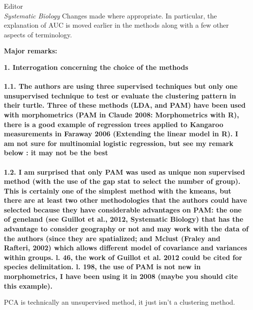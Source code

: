 \documentclass{letter}
\begin{document}
\begin{letter}{Editor \\ \textit{Systematic Biology}}
  Changes made where appropriate. In particular, the explanation of AUC is moved earlier in the methods along with a few other aspects of terminology.


  \textbf{Major remarks: }

  \textbf{1. Interrogation concerning the choice of the methods \\\\
    1.1. The authors are using three supervised techniques but only one unsupervised technique to test or evaluate the clustering pattern in their turtle. Three of these methods (LDA, and PAM) have been used with morphometrics (PAM in Claude 2008: Morphometrics with R), there is a good example of regression trees applied to Kangaroo measurements in Faraway 2006 (Extending the linear model in R). I am not sure for multinomial logistic regression, but see my remark below : it may not be the best\\\\
  1.2. I am surprised that only PAM was used as unique non supervised method (with the use of the gap stat to select the number of group). This is certainly one of the simplest method with the kmeans, but there are at least two other methodologies that the authors could have selected because they have considerable advantages on PAM: the one of geneland (see Guillot et al., 2012, Systematic Biology) that has the advantage to consider geography or not and may work with the data of the authors (since they are spatialized; and Mclust (Fraley and Rafteri, 2002) which allows different model of covariance and variances within groups. l. 46, the work of Guillot et al. 2012 could be cited for species delimitation. l. 198, the use of PAM is not new in morphometrics, I have been using it in 2008 (maybe you should cite this example). }

  PCA is technically an unsupervised method, it just isn't a clustering method.



\end{letter}
\end{document}
